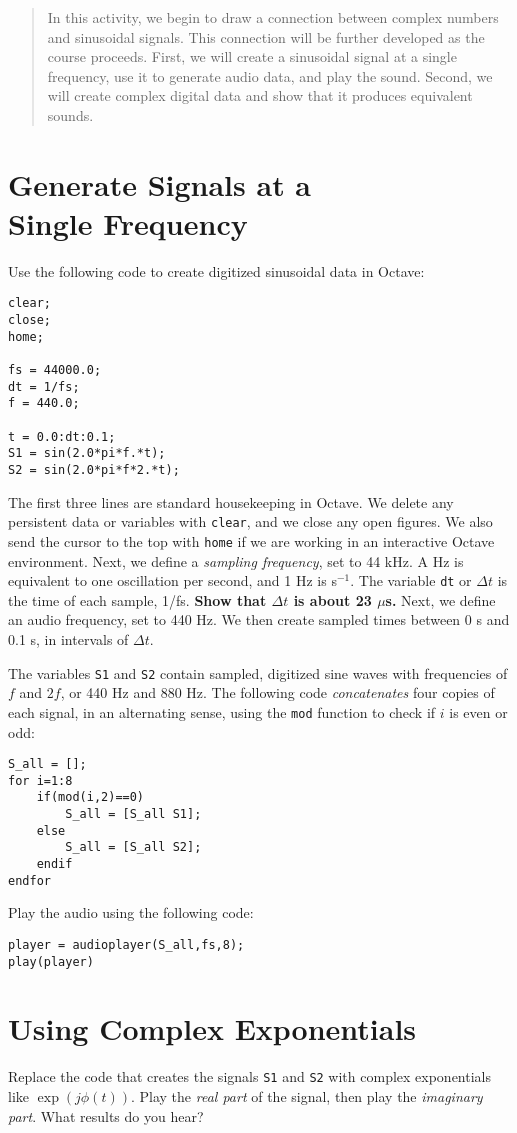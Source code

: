 \documentclass[12pt]{article}
\begin{document}
\twocolumn
\maketitle

\begin{abstract}
In this activity, we begin to draw a connection between complex numbers and sinusoidal signals.  This connection will be further developed as the course proceeds.  First, we will create a sinusoidal signal at a single frequency, use it to generate audio data, and play the sound.  Second, we will create complex digital data and show that it produces equivalent sounds.
\end{abstract}

\section{Generate Signals at a \\ Single Frequency}

Use the following code to create digitized sinusoidal data in Octave:

\begin{verbatim}
clear;
close;
home;

fs = 44000.0;
dt = 1/fs;
f = 440.0;

t = 0.0:dt:0.1;
S1 = sin(2.0*pi*f.*t);
S2 = sin(2.0*pi*f*2.*t);
\end{verbatim}

The first three lines are standard housekeeping in Octave.  We delete any persistent data or variables with \verb+clear+, and we close any open figures.  We also send the cursor to the top with \verb+home+ if we are working in an interactive Octave environment.  Next, we define a \textit{sampling frequency}, set to 44 kHz.  A Hz is equivalent to one oscillation per second, and 1 Hz is s$^{-1}$.  The variable \verb+dt+ or $\Delta t$ is the time of each sample, 1/fs.  \textbf{Show that $\Delta t$ is about 23 $\mu$s.}  Next, we define an audio frequency, set to 440 Hz.  We then create sampled times between 0 s and 0.1 s, in intervals of $\Delta t$.

The variables \verb+S1+ and \verb+S2+ contain sampled, digitized sine waves with frequencies of $f$ and $2f$, or 440 Hz and 880 Hz.  The following code \textit{concatenates} four copies of each signal, in an alternating sense, using the \verb+mod+ function to check if $i$ is even or odd:

\begin{verbatim}
S_all = [];
for i=1:8
    if(mod(i,2)==0)
        S_all = [S_all S1];
    else
        S_all = [S_all S2];
    endif
endfor
\end{verbatim}
Play the audio using the following code:
\begin{verbatim}
player = audioplayer(S_all,fs,8);
play(player)
\end{verbatim}

\section{Using Complex Exponentials}

Replace the code that creates the signals \verb+S1+ and \verb+S2+ with complex exponentials like $\exp(j \phi(t))$.  Play the \textit{real part} of the signal, then play the \textit{imaginary part}.  What results do you hear?
\end{document}
